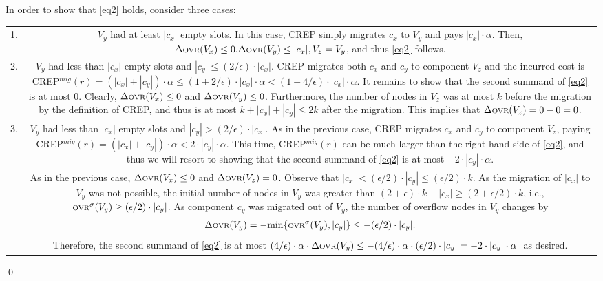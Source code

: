 \documentclass[xcolor=dvipsnames, tikz, 12pt]{article}
\newcommand{\crep}{C{\scriptsize REP}}
\newcommand{\ovr}{\text{\scriptsize OVR}}
\theoremstyle{definition}
\begin{document}
In order to show that \ref{eq2} holds, consider three cases:

\begin{tabularx}{\textwidth}{cC}
	1. &$V_y$ had at least $|c_x|$ empty slots. In this case, \crep{} simply migrates $c_x$ to $V_y$ and pays $|c_x|\cdot\alpha$. Then, $\Delta\ovr{}(V_x)\leq0. \Delta\ovr{}(V_y)\leq|c_x|, V_z=V_y$, and thus \ref{eq2} follows.\\
	
	2. &$V_y$ had less than $|c_x|$ empty slots and $|c_y|\leq(2/\epsilon)\cdot|c_x|$. \crep{} migrates both $c_x$ and $c_y$ to component $V_z$ and the incurred cost is \crep{}$^{mig}(r)=(|c_x|+|c_y|)\cdot\alpha\leq(1+2/\epsilon)\cdot|c_x|\cdot\alpha<(1+4/\epsilon)\cdot|c_x|\cdot\alpha$. It remains to show that the second summand of \ref{eq2} is at most 0. Clearly, $\Delta\ovr{}(V_x)\leq0$ and $\Delta\ovr{}(V_y)\leq0$. Furthermore, the number of nodes in $V_z$ was at most $k$ before the migration by the definition of \crep{}, and thus is at most $k+|c_x|+|c_y|\leq 2k$ after the migration. This implies that $\Delta\ovr{}(V_z)=0-0=0$.\\
	3. &$V_y$ had less than $|c_x|$ empty slots and $|c_y|>(2/\epsilon)\cdot|c_x|$. As in the previous case, \crep{} migrates $c_x$ and $c_y$ to component $V_z$, paying \crep{}$^{mig}(r)=(|c_x|+|c_y|)\cdot\alpha<2\cdot|c_y|\cdot\alpha$. This time, \crep{}$^{mig}(r)$ can be much larger than the right hand side of \ref{eq2}, and thus we will resort to showing that the second summand of \ref{eq2} is at most $-2\cdot|c_y|\cdot\alpha$.\\
	
	&As in the previous case, $\Delta\ovr{}(V_x)\leq0$ and $\Delta\ovr{}(V_z)=0$. Observe that $|c_x|<(\epsilon/2)\cdot|c_y|\leq(\epsilon/2)\cdot k$. As the migration of $|c_x|$ to $V_y$ was not possible, the initial number of nodes in $V_y$ was greater than $(2+\epsilon)\cdot k-|c_x|\geq(2+\epsilon/2)\cdot k$, i.e., $\ovr{}^\sigma(V_y)\geq(\epsilon/2)\cdot |c_y|$. As component $c_y$ was migrated out of $V_y$, the number of overflow nodes in $V_y$ changes by
	\begin{align*}
	\Delta\ovr{}(V_y)=-\text{min}\{\ovr{}^\sigma(V_y), |c_y|\}\leq-(\epsilon/2)\cdot|c_y|.
	\end{align*}
	Therefore, the second summand of \ref{eq2} is at most $(4/\epsilon)\cdot\alpha\cdot\Delta\ovr{}(V_y)\leq-(4/\epsilon)\cdot\alpha\cdot(\epsilon/2)\cdot|c_y|=-2\cdot|c_y|\cdot\alpha|$ as desired. \\
	\end{tabularx}\qed
\end{document}
